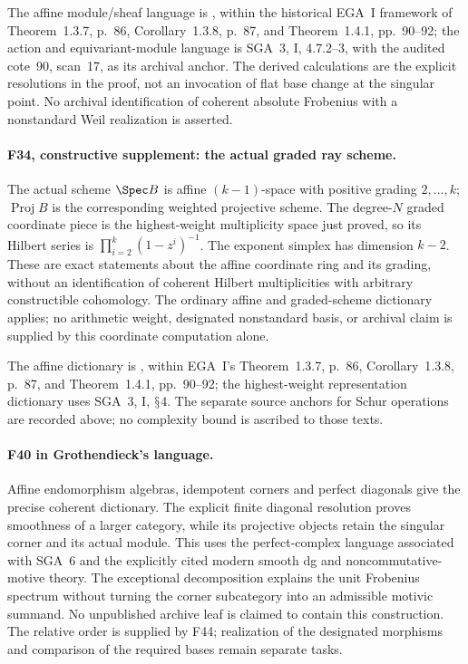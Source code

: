 \documentclass[11pt,a4paper]{article}
\renewcommand{\S}{\ensuremath{\mathsection}}
\newcommand{\fid}[1]{\textsf{#1}}\newcommand{\gate}[1]{\textsf{#1}}
\theoremstyle{named}\newtheorem{finding}{Finding}[section]
\theoremstyle{definition}\newtheorem{definition}[finding]{Definition}
\theoremstyle{remark}\newtheorem{remark}[finding]{Remark}
\begin{document}
The affine module/sheaf language is
\cite[Lemma~26.7.5, tag~01IB]{StacksAffine}, within the
historical EGA~I framework of Theorem~1.3.7, p.~86,
Corollary~1.3.8, p.~87, and Theorem~1.4.1, pp.~90--92; the action and
equivariant-module language is SGA~3, I, 4.7.2--3, with the audited
cote~90, scan~17, as its archival anchor. The derived calculations
are the explicit resolutions in the proof, not an invocation of
flat base change at the singular point. No archival identification
of coherent absolute Frobenius with a nonstandard Weil realization
is asserted.


\paragraph{\fid{F34}, constructive supplement: the actual graded ray scheme.}
The actual scheme $\Spec B$ is affine $(k-1)$-space with positive
grading $2,\ldots,k$; $\operatorname{Proj}B$ is the corresponding
weighted projective scheme. The degree-$N$ graded coordinate piece
is the highest-weight multiplicity space just proved, so its Hilbert
series is $\prod_{i=2}^k(1-z^i)^{-1}$. The exponent simplex has
dimension $k-2$. These are exact statements about the affine
coordinate ring and its grading, without an identification of
coherent Hilbert multiplicities with arbitrary constructible
cohomology. The ordinary affine and graded-scheme dictionary applies;
no arithmetic weight, designated nonstandard basis, or archival
claim is supplied by this coordinate computation alone.

The affine dictionary is \cite[Lemma~26.7.5, tag~01IB]{StacksAffine},
within EGA~I's Theorem~1.3.7, p.~86, Corollary~1.3.8,
p.~87, and Theorem~1.4.1, pp.~90--92; the highest-weight
representation dictionary uses SGA~3, I, \S4. The separate source anchors for Schur operations are recorded above; no complexity bound is ascribed to those texts.


\paragraph{\fid{F40} in Grothendieck's language.}
Affine endomorphism algebras, idempotent corners and perfect
diagonals give the precise coherent dictionary. The explicit
finite diagonal resolution proves smoothness of a larger category,
while its projective objects retain the singular corner and its
actual module. This uses the perfect-complex language associated
with SGA~6 and the explicitly cited modern smooth dg and
noncommutative-motive theory. The exceptional decomposition
explains the unit Frobenius spectrum without turning the corner
subcategory into an admissible motivic summand. No unpublished
archive leaf is claimed to contain this construction. The relative
order is supplied by \fid{F44}; realization of the designated
morphisms and comparison of the required bases remain separate tasks.
\end{document}
